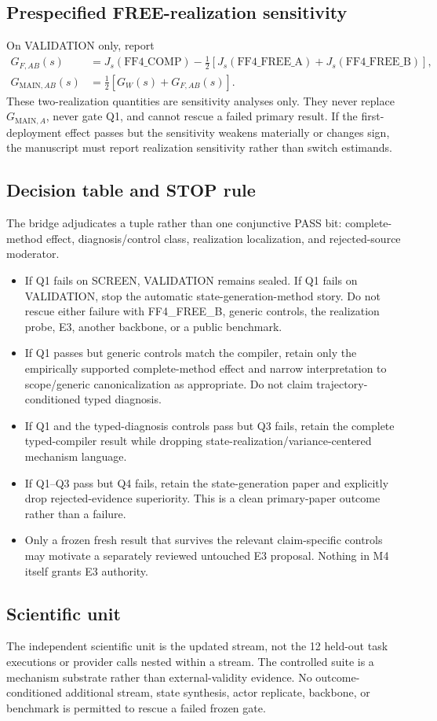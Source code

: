 \subsection{Prespecified FREE-realization sensitivity}
On VALIDATION only, report
\begin{align}
G_{F,AB}(s) &= J_s(\text{FF4\_COMP})-\tfrac{1}{2}[J_s(\text{FF4\_FREE\_A})+J_s(\text{FF4\_FREE\_B})],\\
G_{\mathrm{MAIN},AB}(s) &= \tfrac{1}{2}[G_W(s)+G_{F,AB}(s)].
\end{align}
These two-realization quantities are sensitivity analyses only. They never replace $G_{\mathrm{MAIN},A}$, never gate Q1, and cannot rescue a failed primary result. If the first-deployment effect passes but the sensitivity weakens materially or changes sign, the manuscript must report realization sensitivity rather than switch estimands.

\subsection{Decision table and STOP rule}
The bridge adjudicates a tuple rather than one conjunctive PASS bit: complete-method effect, diagnosis/control class, realization localization, and rejected-source moderator.
\begin{itemize}
    \item If Q1 fails on SCREEN, VALIDATION remains sealed. If Q1 fails on VALIDATION, stop the automatic state-generation-method story. Do not rescue either failure with FF4\_FREE\_B, generic controls, the realization probe, E3, another backbone, or a public benchmark.
    \item If Q1 passes but generic controls match the compiler, retain only the empirically supported complete-method effect and narrow interpretation to scope/generic canonicalization as appropriate. Do not claim trajectory-conditioned typed diagnosis.
    \item If Q1 and the typed-diagnosis controls pass but Q3 fails, retain the complete typed-compiler result while dropping state-realization/variance-centered mechanism language.
    \item If Q1--Q3 pass but Q4 fails, retain the state-generation paper and explicitly drop rejected-evidence superiority. This is a clean primary-paper outcome rather than a failure.
    \item Only a frozen fresh result that survives the relevant claim-specific controls may motivate a separately reviewed untouched E3 proposal. Nothing in M4 itself grants E3 authority.
\end{itemize}

\subsection{Scientific unit}
The independent scientific unit is the updated stream, not the 12 held-out task executions or provider calls nested within a stream. The controlled suite is a mechanism substrate rather than external-validity evidence. No outcome-conditioned additional stream, state synthesis, actor replicate, backbone, or benchmark is permitted to rescue a failed frozen gate.
